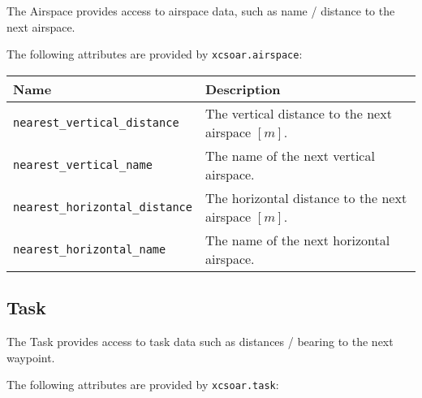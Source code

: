 The Airspace provides access to airspace data, such as name / distance
to the next airspace.

The following attributes are provided by \verb|xcsoar.airspace|:

\begin{maxipage}
\begin{tabularx}{1.9\textwidth}{l|X}
Name & Description \\
\hline\hline

\verb|nearest_vertical_distance| & The vertical distance to the next airspace
$[{m}]$.\\

\hline

\verb|nearest_vertical_name| & The name of the next vertical airspace. \\

\hline

\verb|nearest_horizontal_distance| & The horizontal distance to the next airspace 
$[{m}]$. \\

\hline

\verb|nearest_horizontal_name| & The name of the next horizontal airspace. \\

\end{tabularx}
\end{maxipage}

\subsection{Task}

The Task provides access to task data such as distances / bearing to the 
next waypoint.

The following attributes are provided by \verb|xcsoar.task|:

